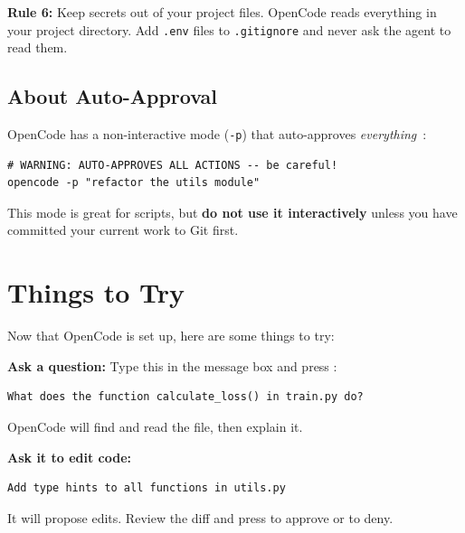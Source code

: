\documentclass[12pt]{article}
\newcommand{\key}[1]{\keystroke{#1}}
\newcommand{\keystroke}[1]{%
  \tikz[baseline=(key.base)]{%
    \node[draw, rounded corners=2pt, inner sep=2pt, fill=gray!10,
          font=\ttfamily\small] (key) {#1};%
  }%
}
\begin{document}
\begin{alert-box}
\textbf{Rule 6:} Keep secrets out of your project files.  OpenCode reads everything in your project directory.  Add \texttt{.env} files to \texttt{.gitignore} and never ask the agent to read them.
\end{alert-box}

\subsection{About Auto-Approval}

OpenCode has a non-interactive mode (\texttt{-p}) that auto-approves \emph{everything}~\cite{opencode_readme2025}:

\begin{lstlisting}[style=term]
# WARNING: AUTO-APPROVES ALL ACTIONS -- be careful!
opencode -p "refactor the utils module"
\end{lstlisting}

\begin{def-box}
This mode is great for scripts, but \textbf{do not use it interactively} unless you have committed your current work to Git first.
\end{def-box}

\section{Things to Try}

Now that OpenCode is set up, here are some things to try:

\begin{ex-box}
\textbf{Ask a question:}  Type this in the message box and press \key{Ctrl+S}:
\begin{lstlisting}[style=term,frame=none,backgroundcolor=\color{white}]
What does the function calculate_loss() in train.py do?
\end{lstlisting}
OpenCode will find and read the file, then explain it.
\end{ex-box}

\begin{ex-box}
\textbf{Ask it to edit code:}
\begin{lstlisting}[style=term,frame=none,backgroundcolor=\color{white}]
Add type hints to all functions in utils.py
\end{lstlisting}
It will propose edits.  Review the diff and press \key{a} to approve or \key{d} to deny.
\end{ex-box}
\end{document}
